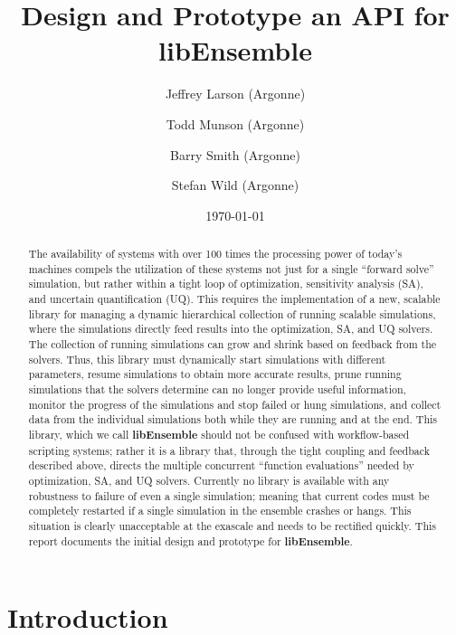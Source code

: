 \documentclass{ecpreport}
\title{Design and Prototype an API for libEnsemble}
\author{Jeffrey Larson (Argonne)
  \and  Todd Munson (Argonne)
  \and  Barry Smith (Argonne)
  \and  Stefan Wild (Argonne)
}
\date{\today}
\begin{document}
\frontmatter


\begin{abstract}
The availability of systems with over 100 times the processing power of today’s 
machines compels the utilization of these systems not just for a single ``forward
solve'' simulation, but rather within a tight loop of optimization, sensitivity 
analysis (SA), and uncertain quantification (UQ). This requires the implementation 
of a new, scalable library for managing a dynamic hierarchical collection of 
running scalable simulations, where the simulations directly feed results 
into the optimization, SA, and UQ solvers.  The collection of running simulations 
can grow and shrink based on feedback from the solvers. Thus, this library must 
dynamically start simulations with different parameters, resume simulations to 
obtain more accurate results, prune running simulations that the solvers determine 
can no longer provide useful information, monitor the progress of the simulations 
and stop failed or hung simulations, and collect data from the individual 
simulations both while they are running and at the end.  This library, which 
we call {\bf libEnsemble} should not be confused with workflow-based scripting 
systems; rather it is a library that, through the tight coupling and feedback 
described above, directs the multiple concurrent ``function evaluations'' 
needed by optimization, SA, and UQ solvers. Currently no library is available 
with any robustness to failure of even a single simulation; meaning that current 
codes must be completely restarted if a single simulation in the ensemble 
crashes or hangs. This situation is clearly unacceptable at the exascale
and needs to be rectified quickly.  This report documents the initial
design and prototype for {\bf libEnsemble}.
\end{abstract}


\mainmatter
\section{Introduction}
\end{document}
